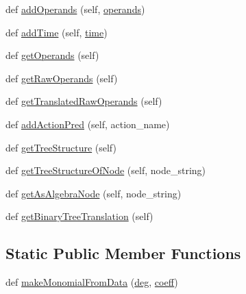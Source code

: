 \begin{DoxyCompactItemize}
\item 
def \hyperlink{classeqn__viz_1_1_equation_step_parser_a10af6718bc6cd5d922726a0601d4e3d0}{add\+Operands} (self, \hyperlink{classeqn__viz_1_1_equation_step_parser_a8dbcb5a11bdc6d35899333318be43e66}{operands})
\item 
def \hyperlink{classeqn__viz_1_1_equation_step_parser_a6462eb647544bb038cfa104862acca83}{add\+Time} (self, \hyperlink{classeqn__viz_1_1_equation_step_parser_af3fdecc987d26e93a0a0944c4e634fe3}{time})
\item 
def \hyperlink{classeqn__viz_1_1_equation_step_parser_a645799da7729f295a93a8736d7710d27}{get\+Operands} (self)
\item 
def \hyperlink{classeqn__viz_1_1_equation_step_parser_ab549ae0874ba23b167a815640cb412d7}{get\+Raw\+Operands} (self)
\item 
def \hyperlink{classeqn__viz_1_1_equation_step_parser_a0aa875f7904a2063ac93eb8eac596c6e}{get\+Translated\+Raw\+Operands} (self)
\item 
def \hyperlink{classeqn__viz_1_1_equation_step_parser_a78e4cabf7cf0ccce566d2a6364164f05}{add\+Action\+Pred} (self, action\+\_\+name)
\item 
def \hyperlink{classeqn__viz_1_1_equation_step_parser_a18b126ffe42eafc26159db46c87431ac}{get\+Tree\+Structure} (self)
\item 
def \hyperlink{classeqn__viz_1_1_equation_step_parser_a7806680f136f17b2c821d00f8c9aa1df}{get\+Tree\+Structure\+Of\+Node} (self, node\+\_\+string)
\item 
def \hyperlink{classeqn__viz_1_1_equation_step_parser_a7c5b9f5ab72ab048907933b2d9fdc27f}{get\+As\+Algebra\+Node} (self, node\+\_\+string)
\item 
def \hyperlink{classeqn__viz_1_1_equation_step_parser_ab0e8e3c3adce6ace6a3b9f8ba7a96757}{get\+Binary\+Tree\+Translation} (self)
\end{DoxyCompactItemize}
\subsection*{Static Public Member Functions}
\begin{DoxyCompactItemize}
\item 
def \hyperlink{classeqn__viz_1_1_equation_step_parser_ad573555604fd5d1baa33c2be67167883}{make\+Monomial\+From\+Data} (\hyperlink{namespaceeqn__viz_a1376f5d1deece596253f6876d746a500}{deg}, \hyperlink{namespaceeqn__viz_ae1292d980053c2a15be129430ee3ebb1}{coeff})
\end{DoxyCompactItemize}
